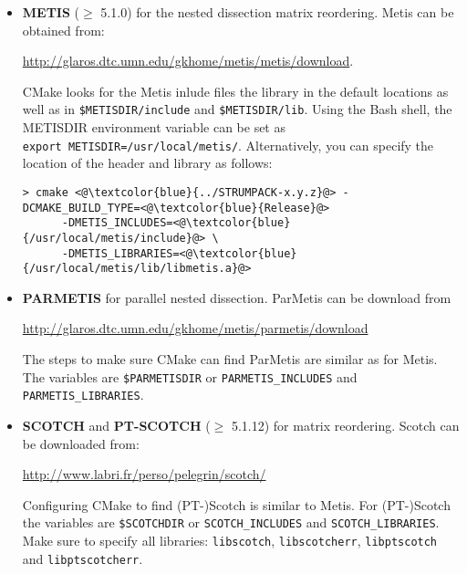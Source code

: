 \documentclass{article}
\begin{document}
\begin{itemize}
\begin{lstlisting}[style=Bash]
  \end{lstlisting}
  Or one can also directly modify the linker flags to add the
  ScaLAPACK and BLACS libraries:
  \begin{lstlisting}[style=Bash]
    > cmake <@\textcolor{blue}{../STRUMPACK-x.y.z}@> -DCMAKE_BUILD_TYPE=<@\textcolor{blue}{Release}@>
       -DCMAKE_EXE_LINKER_FLAGS=<@\textcolor{blue}{"-L/usr/lib64/mpich/lib/ -lscalapack -lmpiblacs"}@>
  \end{lstlisting}
\item \textbf{METIS} ($\geq$ 5.1.0) for the nested dissection matrix
  reordering. Metis can be obtained from:

  \url{http://glaros.dtc.umn.edu/gkhome/metis/metis/download}.

  CMake looks for the Metis inlude files the library in the default
  locations as well as in
  \lstinline[style=Bash]!$METISDIR/include!  and
  \lstinline[style=Bash]!$METISDIR/lib!. Using the Bash shell, the
  METISDIR environment variable can be set as\\
  \lstinline[style=Bash]!export METISDIR=/usr/local/metis/!.
  Alternatively, you can specify the
  location of the header and library as follows:
  \begin{lstlisting}[style=Bash]
    > cmake <@\textcolor{blue}{../STRUMPACK-x.y.z}@> -DCMAKE_BUILD_TYPE=<@\textcolor{blue}{Release}@>
      -DMETIS_INCLUDES=<@\textcolor{blue}{/usr/local/metis/include}@> \
      -DMETIS_LIBRARIES=<@\textcolor{blue}{/usr/local/metis/lib/libmetis.a}@>
  \end{lstlisting}

\item \textbf{PARMETIS} for parallel nested dissection. ParMetis can
  be download from

  \url{http://glaros.dtc.umn.edu/gkhome/metis/parmetis/download}

  The steps to make sure CMake can find ParMetis are similar as for
  Metis. The variables are
  \lstinline[style=Bash]!$PARMETISDIR! or
  \lstinline[style=Bash]!PARMETIS_INCLUDES! and
  \lstinline[style=Bash]!PARMETIS_LIBRARIES!.

\item \textbf{SCOTCH} and \textbf{PT-SCOTCH} ($\geq$ 5.1.12) for
  matrix reordering. Scotch can be downloaded from:

  \url{http://www.labri.fr/perso/pelegrin/scotch/}

  Configuring CMake to find (PT-)Scotch is similar to Metis. For
  (PT-)Scotch the variables are
  \lstinline[style=Bash]!$SCOTCHDIR! or
  \lstinline[style=Bash]!SCOTCH_INCLUDES! and
  \lstinline[style=Bash]!SCOTCH_LIBRARIES!. Make sure to specify all
  libraries: \lstinline[style=Bash]!libscotch!,
  \lstinline[style=Bash]!libscotcherr!,
  \lstinline[style=Bash]!libptscotch! and
  \lstinline[style=Bash]!libptscotcherr!.


\end{itemize}
\end{document}

